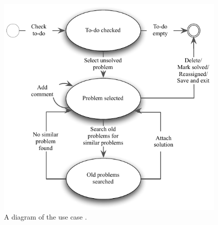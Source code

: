 \begin{figure}[h]
\begin{center}
 \includegraphics[scale=1]{input/application_domain_analysis/solve_problem_use_case}
\caption{A diagram of the use case \ucsolproblem{}.}
\label{fig:solve_problem_use_case}
\end{center}
\end{figure}

